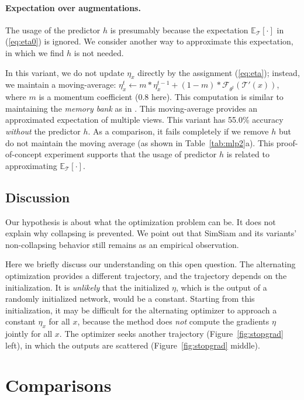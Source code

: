 \documentclass[final]{cvpr}
\begin{document}
\paragraph{Expectation over augmentations.} The usage of the predictor $h$ is presumably because the expectation $\mathbb{E}_{\mathcal{T}}[\cdot]$ in (\ref{eq:eta0}) is ignored. We consider another way to approximate this expectation, in which we find $h$ is not needed.

In this variant, we do not update $\eta_x$ directly by the assignment (\ref{eq:eta}); instead, we maintain a moving-average: $\eta^t_x \leftarrow m* \eta^{t-1}_x + (1-m)* \mathcal{F}_{\theta^t}(\mathcal{T'}(x))$, where $m$ is a momentum coefficient (0.8 here). This computation is similar to maintaining the \emph{memory bank} as in \cite{Wu2018a}.
This moving-average provides an approximated expectation of multiple views.
This variant has 55.0\% accuracy \emph{without} the predictor $h$. As a comparison, it fails completely if we remove $h$ but do not maintain the moving average (as shown in Table~\ref{tab:mlp2}a). This proof-of-concept experiment supports that the usage of predictor $h$ is related to approximating $\mathbb{E}_{\mathcal{T}}[\cdot]$.

\subsection{Discussion}

Our hypothesis is about what the optimization problem can be. It does not explain why collapsing is prevented.
We point out that SimSiam and its variants' non-collapsing behavior still remains as an empirical observation.

Here we briefly discuss our understanding on this open question. 
The alternating optimization provides a different trajectory, and the trajectory depends on the initialization.
It is \emph{unlikely} that the initialized $\eta$, which is the output of a randomly initialized network, would be a constant.
Starting from this initialization, it may be difficult for the alternating optimizer to approach a constant $\eta_x$ for all $x$, because the method does \emph{not} compute the gradients \wrt $\eta$ jointly for all $x$.
The optimizer seeks another trajectory (Figure~\ref{fig:stopgrad} left), in which the outputs are scattered (Figure~\ref{fig:stopgrad} middle).


\section{Comparisons} \label{sec:results}
\end{document}
